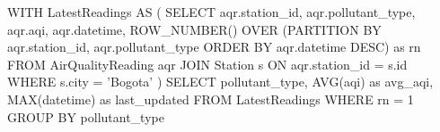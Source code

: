 WITH LatestReadings AS (
    SELECT 
        aqr.station_id,
        aqr.pollutant_type,
        aqr.aqi,
        aqr.datetime,
        ROW_NUMBER() OVER (PARTITION BY aqr.station_id, aqr.pollutant_type 
        ORDER BY aqr.datetime DESC) as rn
    FROM AirQualityReading aqr
    JOIN Station s ON aqr.station_id = s.id
    WHERE s.city = 'Bogota'
)
SELECT 
    pollutant_type,
    AVG(aqi) as avg_aqi,
    MAX(datetime) as last_updated
FROM LatestReadings
WHERE rn = 1
GROUP BY pollutant_type